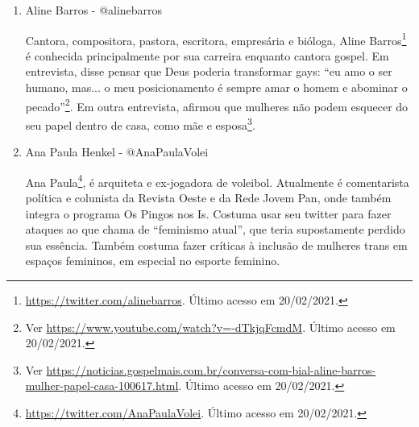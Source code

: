 \documentclass[
	12pt,				%
	openright,			%
	twoside,			%
	a4paper,			%
	english,			%
	brazil				%
	]{abntex2}
\begin{document}
\begin{anexosenv}
\begin{enumerate}
 \begin{figure}[!htbp]
    \centering
    \texttt{[image: alexgarcia\_2.png]}
    \caption{Postagem no Twitter de Alexandre Garcia. Disponível em \url{https://twitter.com/alexandregarcia/status/837438307663560704}. Último acesso em 20/02/2021.}
    \label{fig:garciafonda}
 \end{figure}

 \item Aline Barros - @alinebarros
 
 Cantora, compositora, pastora, escritora, empresária e bióloga, Aline Barros\footnote{\url{https://twitter.com/alinebarros}. Último acesso em 20/02/2021.} é conhecida principalmente por sua carreira enquanto cantora gospel. Em entrevista, disse pensar que Deus poderia transformar gays: ``eu amo o ser humano, mas... o meu posicionamento é sempre amar o homem e abominar o pecado''\footnote{Ver \url{https://www.youtube.com/watch?v=-dTkjqFcmdM}. Último acesso em 20/02/2021.}. Em outra entrevista, afirmou que mulheres não podem esquecer do seu papel dentro de casa, como mãe e esposa\footnote{Ver \url{https://noticias.gospelmais.com.br/conversa-com-bial-aline-barros-mulher-papel-casa-100617.html}. Último acesso em 20/02/2021.}.
 
 \newpage

 \item Ana Paula Henkel - @AnaPaulaVolei
 
 Ana Paula\footnote{\url{https://twitter.com/AnaPaulaVolei}. Último acesso em 20/02/2021.}, é arquiteta e ex-jogadora de voleibol. Atualmente é comentarista política e colunista da Revista Oeste e da Rede Jovem Pan, onde também integra o programa Os Pingos nos Is. Costuma usar seu twitter para fazer ataques ao que chama de ``feminismo atual'', que teria supostamente perdido sua essência. Também costuma fazer críticas à inclusão de mulheres trans em espaços femininos, em especial no esporte feminino.
 
 
 

\end{enumerate}
\end{anexosenv}
\end{document}
